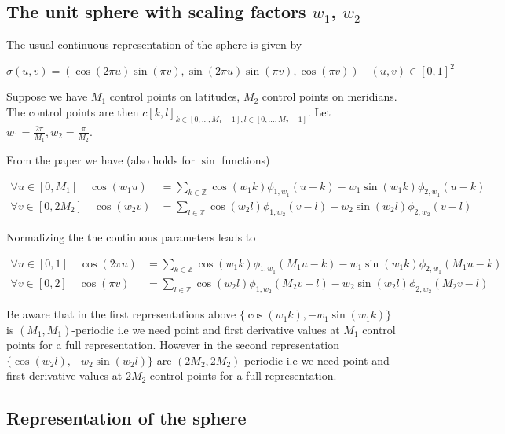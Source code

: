 \documentclass[a4paper, 11pt]{article}
\begin{document}
\subsection{The unit sphere with scaling factors $w_1$, $w_2$}

The usual continuous representation of the sphere is given by

\begin{equation}
  \sigma(u,v) = \left(\cos(2\pi u)\sin(\pi v), \sin(2\pi u)\sin(\pi v), \cos(\pi v)\right) \quad (u, v) \in {[0,1]}^2
\end{equation}

Suppose we have $M_1$ control points on latitudes, $M_2$ control points on meridians. The control points are then 
${c[k,l]}_{k \in [0, \ldots, M_1-1], l \in [0, \ldots, M_2-1]}$. Let $w_1 = \frac{2\pi}{M_1}, w_2 = \frac{\pi}{M_2}$.  

From the paper we have (also holds for $\sin$ functions)

\begin{align*}
  \forall u \in [0, M_1] \quad \cos(w_1u) &= \sum_{k \in \mathbb{Z}} \cos (w_1k) \phi_{1, w_1}(u-k) - w_1 \sin (w_1k) 
  \phi_{2, w_1} (u-k) \\
  \forall v \in [0, 2M_2] \quad \cos(w_2v) &= \sum_{l \in \mathbb{Z}} \cos (w_2l) \phi_{1, w_2}(v-l) - w_2 \sin (w_2l) 
\phi_{2, w_2} (v-l) \end{align*}

Normalizing the the continuous parameters leads to

\begin{align*}
  \forall u \in [0, 1] \quad \cos(2\pi u) &= \sum_{k \in \mathbb{Z}} \cos (w_1k) \phi_{1, w_1}(M_1u-k) - w_1 \sin (w_1k) 
  \phi_{2, w_1} (M_1u-k) \\
  \forall v \in [0, 2] \quad \cos(\pi v) &= \sum_{l \in \mathbb{Z}} \cos (w_2l) \phi_{1, w_2}(M_2v-l) - w_2 \sin (w_2l)
\phi_{2, w_2} (M_2v-l)
\end{align*}

Be aware that in the first representations above $\{\cos (w_1k), -w_1\sin(w_1k)\}$ is $(M_1, M_1)$-periodic i.e we need 
point and first derivative values at $M_1$ control points for a full representation. However in the second 
representation $\{\cos (w_2l), -w_2\sin(w_2l)\}$ are $(2M_2, 2M_2)$-periodic i.e we need point and first derivative 
values at $2M_2$ control points for a full representation. 

\subsection{Representation of the sphere}
\end{document}
